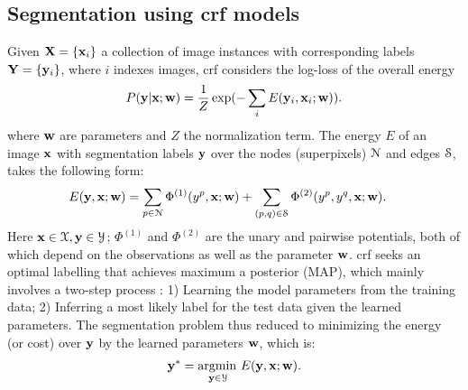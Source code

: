 \documentclass[10pt,3p]{elsarticle}
\def\argmin{\operatorname*{argmin\,}}
\newcommand{\crf}{{\sc crf}\xspace}
\def\bw{{\bf w}}
\def\bx{{\bf x}}
\def\by{{\bf y}}
\def\bh{{ \Phi }}
\let\x\bx
\let\y\by
\let\w\bw
\def\X{ {\bf X } }
\def\Y{ {\bf Y } }
\begin{document}
\subsection{Segmentation using \crf models}

Given $\X=\{\x_i\}$ a collection of image instances with corresponding labels $\Y=\{\y_i\}$, where $i$ indexes images,
\crf \cite{Lafferty01Conditional} considers the log-loss of the overall energy
\begin{align}  \label{eq:crf_log}
P(\y|\x; \w) = \frac{1}{Z} \exp (-\sum_i E(\y_i, \x_i;\w)).
\end{align}
where  $\w$ are parameters and $Z$ the normalization term.
The energy $E$ of an image $\x$ with segmentation labels $\y$ over the nodes (superpixels) $\cal N$ and edges $\cal S$, takes the following form:
\begin{align}
\label{eq:seg_energy}
	E(\y, \x; \w)& =\sum_{p \in {\cal N} } \bh^{(1)}(y^{p}, \x;\w)
	 + \sum_{(p,q) \in {\cal S}} \bh^{(2)}(y^{p}, y^{q}, \x; \w).
\end{align}
Here $ \bx \in {\cal X}, \by \in {\cal Y}$;
$\bh^{(1)}$ and $\bh^{(2)}$ are the unary and pairwise potentials, both of which depend on the observations as well as the parameter $ \w $.
\crf seeks an optimal labelling that achieves maximum a posterior (MAP), which mainly involves a two-step process \cite{SzummerKH08}: 1) Learning the model parameters from the training data; 2) Inferring a most likely label for the test data given the learned parameters.
The segmentation problem thus reduced to minimizing the energy (or cost) over $\y$ by the learned parameters $ \w $, which is:
\begin{align}
\y^{*}=\argmin_{ \y \in  {\cal Y}} E(\y, \x; \w).
\end{align}
\end{document}
